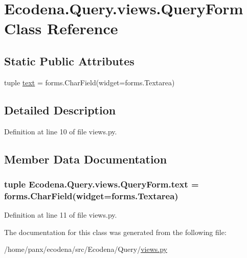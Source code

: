\hypertarget{class_ecodena_1_1_query_1_1views_1_1_query_form}{
\section{Ecodena.Query.views.QueryForm Class Reference}
\label{dd/dee/class_ecodena_1_1_query_1_1views_1_1_query_form}
}
\subsection*{Static Public Attributes}
\begin{DoxyCompactItemize}
\item 
tuple \hyperlink{class_ecodena_1_1_query_1_1views_1_1_query_form_a2c0801fd8cba4ce11004ea7c14823bfa}{text} = forms.CharField(widget=forms.Textarea)
\end{DoxyCompactItemize}


\subsection{Detailed Description}


Definition at line 10 of file views.py.



\subsection{Member Data Documentation}
\hypertarget{class_ecodena_1_1_query_1_1views_1_1_query_form_a2c0801fd8cba4ce11004ea7c14823bfa}{
\subsubsection[{text}]{\setlength{\rightskip}{0pt plus 5cm}tuple {\bf Ecodena.Query.views.QueryForm.text} = forms.CharField(widget=forms.Textarea)}}
\label{dd/dee/class_ecodena_1_1_query_1_1views_1_1_query_form_a2c0801fd8cba4ce11004ea7c14823bfa}


Definition at line 11 of file views.py.



The documentation for this class was generated from the following file:\begin{DoxyCompactItemize}
\item 
/home/panx/ecodena/src/Ecodena/Query/\hyperlink{_query_2views_8py}{views.py}\end{DoxyCompactItemize}
